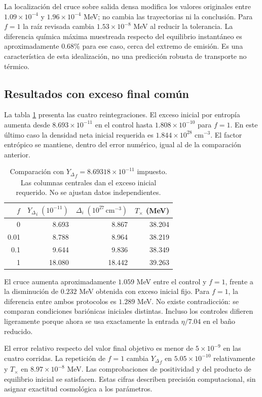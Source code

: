 \documentclass[10pt,twocolumn,a4paper]{article}
\newcommand{\Y}{{Y_\Delta}}
\begin{document}
La localización del cruce sobre salida densa modifica los valores originales entre $1.09\times10^{-4}$ y $1.96\times10^{-4}$ MeV; no cambia las trayectorias ni la conclusión. Para $f=1$ la raíz revisada cambia $1.53\times10^{-8}$ MeV al reducir la tolerancia. La diferencia química máxima muestreada respecto del equilibrio instantáneo es aproximadamente 0.68\% para ese caso, cerca del extremo de emisión. Es una característica de esta idealización, no una predicción robusta de transporte no térmico.

\subsection{Resultados con exceso final común}
La tabla \ref{tab:normalized} presenta las cuatro reintegraciones. El exceso inicial por entropía aumenta desde $8.693\times10^{-11}$ en el control hasta $1.808\times10^{-10}$ para $f=1$. En este último caso la densidad neta inicial requerida es $1.844\times10^{28}$ cm$^{-3}$. El factor entrópico se mantiene, dentro del error numérico, igual al de la comparación anterior.

\begin{table}[t]
\centering\small
\caption{Comparación con $\Y_f=8.69318\times10^{-11}$ impuesto. Las columnas centrales dan el exceso inicial requerido. No se ajustan datos independientes.}\label{tab:normalized}
\begin{tabular}{rrrr}\toprule
$f$&$\Y_i\;(10^{-11})$&$\Delta_i\;(10^{27}\,\mathrm{cm}^{-3})$&$T_\times$ (MeV)\\\midrule
0&8.693&8.867&38.204\\
0.01&8.788&8.964&38.219\\
0.1&9.644&9.836&38.349\\
1&18.080&18.442&39.263\\\bottomrule
\end{tabular}
\end{table}

El cruce aumenta aproximadamente $1.059$ MeV entre el control y $f=1$, frente a la disminución de $0.232$ MeV obtenida con exceso inicial fijo. Para $f=1$, la diferencia entre ambos protocolos es $1.289$ MeV. No existe contradicción: se comparan condiciones bariónicas iniciales distintas. Incluso los controles difieren ligeramente porque ahora se usa exactamente la entrada $\eta/7.04$ en el baño reducido.

El error relativo respecto del valor final objetivo es menor de $5\times10^{-9}$ en las cuatro corridas. La repetición de $f=1$ cambia $\Y_f$ en $5.05\times10^{-10}$ relativamente y $T_\times$ en $8.97\times10^{-8}$ MeV. Las comprobaciones de positividad y del producto de equilibrio inicial se satisfacen. Estas cifras describen precisión computacional, sin asignar exactitud cosmológica a los parámetros.
\end{document}
